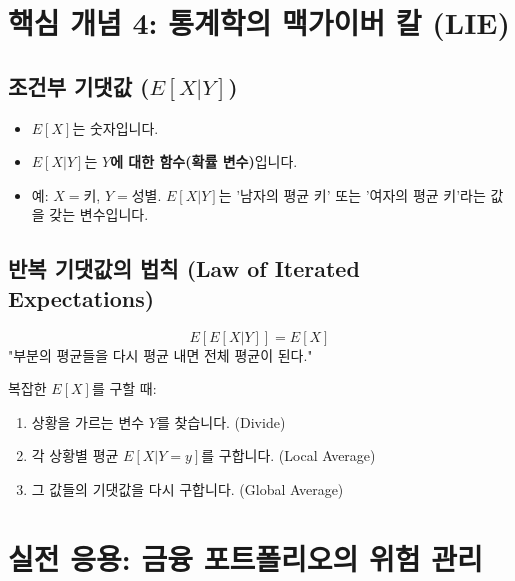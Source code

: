 \documentclass[11pt,a4paper]{book}
\theoremstyle{definition}
\begin{document}
\section{핵심 개념 4: 통계학의 맥가이버 칼 (LIE)}

\subsection{조건부 기댓값 ($E[X|Y]$)}
\begin{itemize}
    \item $E[X]$는 숫자입니다.
    \item $E[X|Y]$는 \textbf{$Y$에 대한 함수(확률 변수)}입니다.
    \item 예: $X=$키, $Y=$성별. $E[X|Y]$는 '남자의 평균 키' 또는 '여자의 평균 키'라는 값을 갖는 변수입니다.
\end{itemize}


\subsection{반복 기댓값의 법칙 (Law of Iterated Expectations)}
\[ E[E[X|Y]] = E[X] \]
"부분의 평균들을 다시 평균 내면 전체 평균이 된다."

\begin{mathstep}[title={LIE 사용법: Divide and Conquer}]
복잡한 $E[X]$를 구할 때:
\begin{enumerate}
    \item 상황을 가르는 변수 $Y$를 찾습니다. (Divide)
    \item 각 상황별 평균 $E[X|Y=y]$를 구합니다. (Local Average)
    \item 그 값들의 기댓값을 다시 구합니다. (Global Average)
\end{enumerate}
\end{mathstep}

\section{실전 응용: 금융 포트폴리오의 위험 관리}
\end{document}
